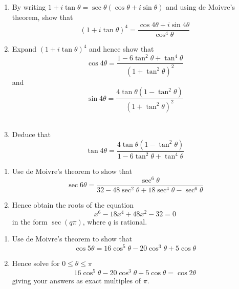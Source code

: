 \documentclass[leqno]{article}
\begin{document}
\begin{enumerate}[
  label=\textbf{\arabic*.},
  leftmargin=*,
  topsep=0pt,
  partopsep=0pt,
  parsep=0pt
]
\begin{enumerate}[label=\textbf{(\alph*)}]
  \item By writing $1+i\tan\theta = \sec\theta(\cos\theta + i\sin\theta)$ and using de Moivre's theorem, show that
  \[
  (1+i\tan\theta)^4 = \frac{\cos 4\theta + i\sin 4\theta}{\cos^4\theta}
  \]
  \item Expand $(1+i\tan\theta)^4$ and hence show that
  \[
  \cos 4\theta = \frac{1-6\tan^2\theta+\tan^4\theta}{(1+\tan^2\theta)^2}
  \]
  and
  \[
  \sin 4\theta = \frac{4\tan\theta(1-\tan^2\theta)}{(1+\tan^2\theta)^2}
  \]
   \\
  \item Deduce that
  \[
  \tan 4\theta = \frac{4\tan\theta(1-\tan^2\theta)}{1-6\tan^2\theta+\tan^4\theta}
  \]
\end{enumerate}

\newpage

\questionitem

\begin{enumerate}[label=\textbf{(\alph*)}]
  \item Use de Moivre's theorem to show that
  \[
  \sec 6\theta = \frac{\sec^6 \theta}{32 - 48\sec^2 \theta + 18\sec^4 \theta - \sec^6 \theta}
  \]
  \item Hence obtain the roots of the equation
  \[
  x^6 - 18x^4 + 48x^2 - 32 = 0
  \]
  in the form $\sec(q\pi)$, where $q$ is rational.  \\
\end{enumerate}

\newpage


\questionitem

\begin{enumerate}[label=\textbf{(\alph*)}]
  \item Use de Moivre's theorem to show that
  \[
  \cos 5\theta = 16\cos^5 \theta - 20\cos^3 \theta + 5\cos \theta
  \]
  \item Hence solve for $0 \le \theta \le \pi$
  \[
  16\cos^5 \theta - 20\cos^3 \theta + 5\cos \theta = \cos 2\theta
  \]
  giving your answers as exact multiples of $\pi$.  \\
\end{enumerate}

\newpage

\questionitem


\end{enumerate}
\end{document}

